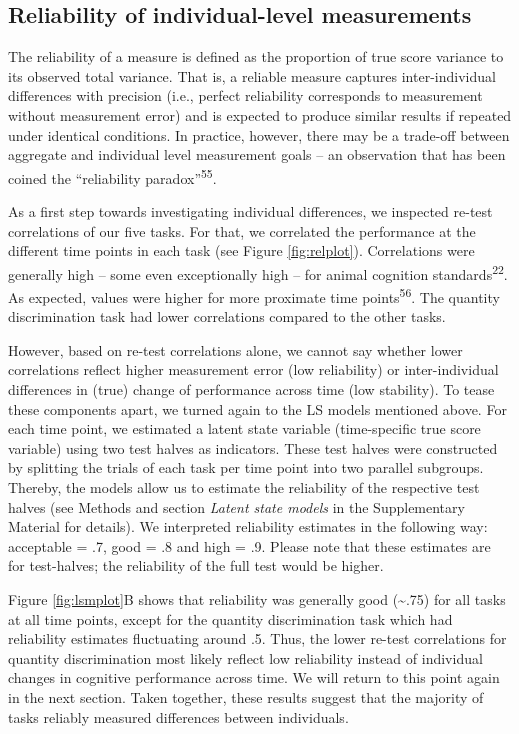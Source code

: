 \documentclass[
  man,floatsintext]{apa6}
\begin{document}
\hypertarget{reliability-of-individual-level-measurements}{%
\subsection{Reliability of individual-level measurements}\label{reliability-of-individual-level-measurements}}

The reliability of a measure is defined as the proportion of true score variance to its observed total variance. That is, a reliable measure captures inter-individual differences with precision (i.e., perfect reliability corresponds to measurement without measurement error) and is expected to produce similar results if repeated under identical conditions. In practice, however, there may be a trade-off between aggregate and individual level measurement goals -- an observation that has been coined the ``reliability paradox''\textsuperscript{55}.

As a first step towards investigating individual differences, we inspected re-test correlations of our five tasks. For that, we correlated the performance at the different time points in each task (see Figure \ref{fig:relplot}). Correlations were generally high -- some even exceptionally high -- for animal cognition standards\textsuperscript{22}. As expected, values were higher for more proximate time points\textsuperscript{56}. The quantity discrimination task had lower correlations compared to the other tasks.

However, based on re-test correlations alone, we cannot say whether lower correlations reflect higher measurement error (low reliability) or inter-individual differences in (true) change of performance across time (low stability). To tease these components apart, we turned again to the LS models mentioned above. For each time point, we estimated a latent state variable (time-specific true score variable) using two test halves as indicators. These test halves were constructed by splitting the trials of each task per time point into two parallel subgroups. Thereby, the models allow us to estimate the reliability of the respective test halves (see Methods and section \emph{Latent state models} in the Supplementary Material for details). We interpreted reliability estimates in the following way: acceptable = .7, good = .8 and high = .9. Please note that these estimates are for test-halves; the reliability of the full test would be higher.

Figure \ref{fig:lsmplot}B shows that reliability was generally good (\textasciitilde.75) for all tasks at all time points, except for the quantity discrimination task which had reliability estimates fluctuating around .5. Thus, the lower re-test correlations for quantity discrimination most likely reflect low reliability instead of individual changes in cognitive performance across time. We will return to this point again in the next section. Taken together, these results suggest that the majority of tasks reliably measured differences between individuals.
\end{document}

